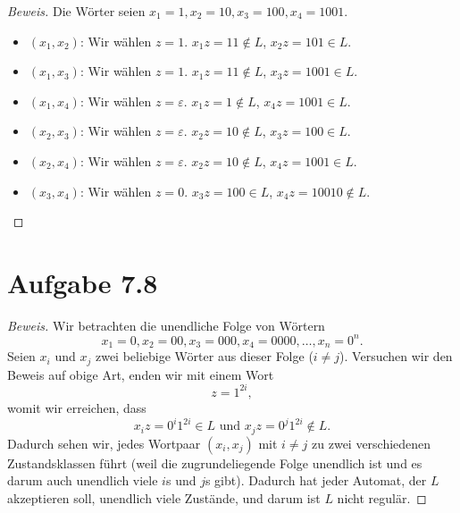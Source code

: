 \documentclass[11pt]{article} %
\theoremstyle{definition}
\begin{document}
\begin{proof}[Beweis]
Die Wörter seien $x_1 = 1, x_2 = 10, x_3 = 100, x_4 = 1001$.

\begin{itemize}
\item $(x_1, x_2)$: Wir wählen $z = 1$. $x_1z = 11 \notin L$, $x_2z = 101 \in L$.
\item $(x_1, x_3)$: Wir wählen $z = 1$. $x_1z = 11 \notin L$, $x_3z = 1001 \in L$.
\item $(x_1, x_4)$: Wir wählen $z = \varepsilon$. $x_1z = 1 \notin L$, $x_4z = 1001 \in L$.
\item $(x_2, x_3)$: Wir wählen $z = \varepsilon$. $x_2z = 10 \notin L$, $x_3z = 100 \in L$.
\item $(x_2, x_4)$: Wir wählen $z = \varepsilon$. $x_2z = 10 \notin L$, $x_4z = 1001 \in L$.
\item $(x_3, x_4)$: Wir wählen $z = 0$. $x_3z = 100 \in L$, $x_4z = 10010 \notin L$.
\end{itemize}
\end{proof}

\section*{Aufgabe 7.8}

\begin{proof}[Beweis]
Wir betrachten die unendliche Folge von Wörtern
\[
x_1 = 0, x_2 = 00, x_3 = 000, x_4 = 0000, \dots, x_n = 0^n.
\]
Seien $x_i$ und $x_j$ zwei beliebige Wörter aus dieser Folge ($i \neq j$). Versuchen wir den Beweis auf obige Art, enden wir mit einem Wort
\[
z = 1^{2i},
\]
womit wir erreichen, dass
\[
x_iz = 0^i1^{2i} \in L \textrm{ und } x_jz = 0^j1^{2i} \notin L.
\]
Dadurch sehen wir, jedes Wortpaar $(x_i, x_j)$ mit $i \neq j$ zu zwei verschiedenen Zustandsklassen führt (weil die zugrundeliegende Folge unendlich ist und es darum auch unendlich viele $i$s und $j$s gibt). Dadurch hat jeder Automat, der $L$ akzeptieren soll, unendlich viele Zustände, und darum ist $L$ nicht regulär.
\end{proof}
\end{document}
